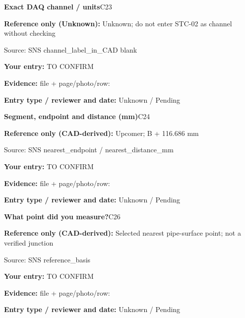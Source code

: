 \documentclass[11pt]{article}
\begin{document}
\par\noindent\begin{minipage}{\textwidth}\small
{\color{navy}\bfseries Exact DAQ channel / units}\hfill C23\par
\colorbox{pale}{\parbox{\dimexpr\linewidth-2\fboxsep\relax}{
\textbf{Reference only (Unknown):} Unknown; do not enter STC-02 as channel without checking\par
{\footnotesize Source: SNS channel\_\allowbreak{}label\_\allowbreak{}in\_\allowbreak{}CAD blank}}}\par
\textbf{Your entry:} {\color{muted}TO CONFIRM}\enspace\hrulefill\par
{\footnotesize\textbf{Evidence:} file + page/photo/row: \hrulefill\par
\textbf{Entry type / reviewer and date:} Unknown / Pending\par
}\end{minipage}\par\vspace{5pt}
\par\noindent\begin{minipage}{\textwidth}\small
{\color{navy}\bfseries Segment, endpoint and distance (mm)}\hfill C24\par
\colorbox{pale}{\parbox{\dimexpr\linewidth-2\fboxsep\relax}{
\textbf{Reference only (CAD-derived):} Upcomer; B + 116.686 mm\par
{\footnotesize Source: SNS nearest\_\allowbreak{}endpoint / nearest\_\allowbreak{}distance\_\allowbreak{}mm}}}\par
\textbf{Your entry:} {\color{muted}TO CONFIRM}\enspace\hrulefill\par
{\footnotesize\textbf{Evidence:} file + page/photo/row: \hrulefill\par
\textbf{Entry type / reviewer and date:} Unknown / Pending\par
}\end{minipage}\par\vspace{5pt}
\par\noindent\begin{minipage}{\textwidth}\small
{\color{navy}\bfseries What point did you measure?}\hfill C26\par
\colorbox{pale}{\parbox{\dimexpr\linewidth-2\fboxsep\relax}{
\textbf{Reference only (CAD-derived):} Selected nearest pipe-surface point; not a verified junction\par
{\footnotesize Source: SNS reference\_\allowbreak{}basis}}}\par
\textbf{Your entry:} {\color{muted}TO CONFIRM}\enspace\hrulefill\par
{\footnotesize\textbf{Evidence:} file + page/photo/row: \hrulefill\par
\textbf{Entry type / reviewer and date:} Unknown / Pending\par
}\end{minipage}\par\vspace{5pt}
\end{document}
